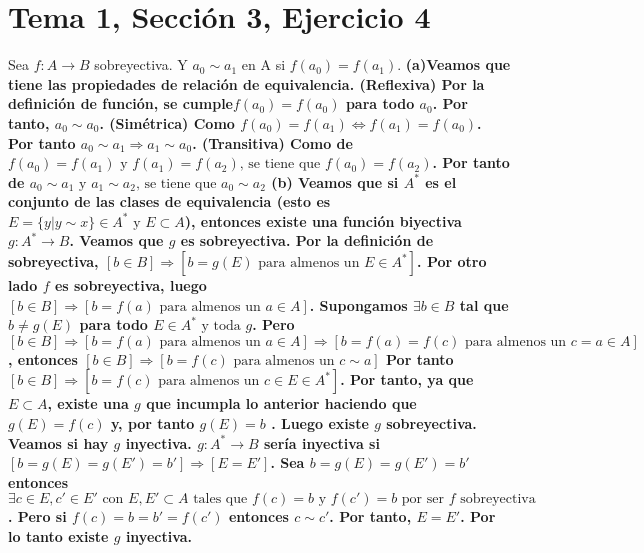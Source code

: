 \documentclass{article}
\begin{document}
\section{Tema 1, Sección 3, Ejercicio 4}
Sea \(f: A\longrightarrow B\) sobreyectiva. Y \(a_0 \sim a_1\) en A si \(f(a_0)=f(a_1)\).
\newline
\bf (a)\rm Veamos que tiene las propiedades de relación de equivalencia. (Reflexiva) Por la definición de función, se cumple\(f(a_0)=f(a_0)\) para todo \(a_0\). Por tanto, \(a_0 \sim a_0\). (Simétrica) Como \(f(a_0)=f(a_1) \Leftrightarrow f(a_1)=f(a_0)\). Por tanto \(a_0 \sim a_1 \Rightarrow a_1 \sim a_0\). (Transitiva) Como de \(f(a_0)=f(a_1) \text{ y }f(a_1)=f(a_2) \text{, se tiene que }  f(a_0)=f(a_2)\). Por tanto de \(a_0 \sim a_1 \text{ y } a_1 \sim a_2 \text{, se tiene que } a_0 \sim a_2\)
\newline
\bf (b) \rm Veamos que si \(A^{*}\) es el conjunto de las clases de equivalencia (esto es \(E=\{y| y\sim x\}\in A^{*} \text{ y } E\subset A\)), entonces existe una función biyectiva \(g: A^{*} \longrightarrow B\). Veamos que \(g\) es sobreyectiva. Por la definición de sobreyectiva, \([b\in B] \Rightarrow [b=g(E) \text{ para almenos un } E\in A^{*}]\). Por otro lado \(f\) es sobreyectiva, luego \([b\in B] \Rightarrow [b=f(a) \text{ para almenos un } a\in A]\). Supongamos \(\exists b\in B\) tal que \(b\neq g(E)\) para todo \(E\in A^{*} \text{ y toda } g\). Pero \([b\in B] \Rightarrow [b=f(a) \text{ para almenos un } a\in A]\Rightarrow [b=f(a)=f(c) \text{ para almenos un } c = a \in A]\),  entonces \([b\in B] \Rightarrow [b=f(c)\text{ para almenos un } c\sim a]\) Por tanto \([b\in B] \Rightarrow [b=f(c) \text{ para almenos un } c\in E \in A^{*}]\). Por tanto, ya que \(E \subset A\), existe una \(g\) que incumpla lo anterior haciendo que \(g(E)=f(c)\)  y, por tanto \(g(E)=b\)  . Luego existe \(g\) sobreyectiva.  Veamos si hay \(g\) inyectiva. \(g:A^{*}\longrightarrow B\) sería inyectiva si \([b=g(E)=g(E')=b']\Rightarrow [E=E']\). Sea \(b=g(E)=g(E')=b'\) entonces  \(\exists c \in E, c'\in E' \text{ con } E, E'\subset A \text{ tales que } f(c)=b\text{ y } f(c')=b\text{ por ser } f \text{ sobreyectiva }\). Pero si \( f(c)=b=b'= f(c')\) entonces \( c \sim c'\). Por tanto, \( E = E'\). Por lo tanto existe \(g\) inyectiva.
\end{document}
